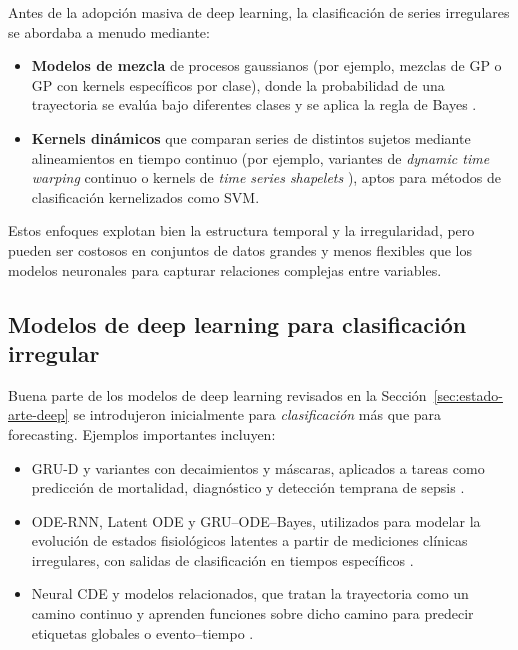 Antes de la adopción masiva de deep learning, la clasificación de series irregulares se abordaba a menudo mediante:
\begin{itemize}
    \item \textbf{Modelos de mezcla} de procesos gaussianos (por ejemplo, mezclas de GP o GP con kernels específicos por clase), donde la probabilidad de una trayectoria se evalúa bajo diferentes clases y se aplica la regla de Bayes \cite{williams2006gaussian}.
    \item \textbf{Kernels dinámicos} que comparan series de distintos sujetos mediante alineamientos en tiempo continuo (por ejemplo, variantes de \emph{dynamic time warping} continuo \cite{sakoe2003dynamic,muller2007information} o kernels de \emph{time series shapelets} \cite{ye2009time,hills2014classification}), aptos para métodos de clasificación kernelizados como SVM.
\end{itemize}

Estos enfoques explotan bien la estructura temporal y la irregularidad, pero pueden ser costosos en conjuntos de datos grandes y menos flexibles que los modelos neuronales para capturar relaciones complejas entre variables.

\subsection{Modelos de deep learning para clasificación irregular}

Buena parte de los modelos de deep learning revisados en la Sección~\ref{sec:estado-arte-deep} se introdujeron inicialmente para \textit{clasificación} más que para forecasting. Ejemplos importantes incluyen:
\begin{itemize}
    \item GRU-D y variantes con decaimientos y máscaras, aplicados a tareas como predicción de mortalidad, diagnóstico y detección temprana de sepsis \cite{che2018recurrent}.
    \item ODE-RNN, Latent ODE y GRU–ODE–Bayes, utilizados para modelar la evolución de estados fisiológicos latentes a partir de mediciones clínicas irregulares, con salidas de clasificación en tiempos específicos \cite{chen2018neural,yulia2019latent,de2019gru}.
    \item Neural CDE y modelos relacionados, que tratan la trayectoria como un camino continuo y aprenden funciones sobre dicho camino para predecir etiquetas globales o evento–tiempo \cite{kidger2020neural}.
\end{itemize}

